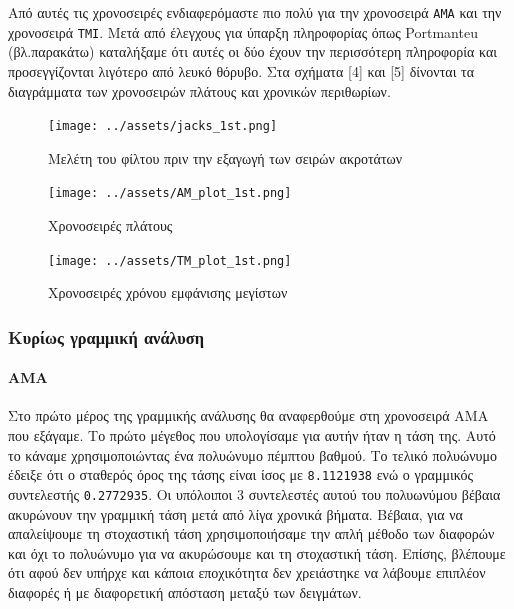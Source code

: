 \documentclass[11pt,]{article}
\let\oldparagraph\paragraph
\renewcommand{\paragraph}[1]{\oldparagraph{#1}\mbox{}}
\begin{document}
Από αυτές τις χρονοσειρές ενδιαφερόμαστε πιο πολύ για την χρονοσειρά
\texttt{AMA} και την χρονοσειρά \texttt{TMI}. Μετά από έλεγχους για
ύπαρξη πληροφορίας όπως Portmanteu (βλ.παρακάτω) καταλήξαμε ότι αυτές οι
δύο έχουν την περισσότερη πληροφορία και προσεγγίζονται λιγότερο από
λευκό θόρυβο. Στα σχήματα {[}4{]} και {[}5{]} δίνονται τα διαγράμματα
των χρονοσειρών πλάτους και χρονικών περιθωρίων.

\begin{figure}
\centering
\texttt{[image: ../assets/jacks\_1st.png]}
\caption{Μελέτη του φίλτου πριν την εξαγωγή των σειρών ακροτάτων}
\end{figure}

\begin{figure}
\centering
\texttt{[image: ../assets/AM\_plot\_1st.png]}
\caption{Χρονοσειρές πλάτους}
\end{figure}

\begin{figure}
\centering
\texttt{[image: ../assets/TM\_plot\_1st.png]}
\caption{Χρονοσειρές χρόνου εμφάνισης μεγίστων}
\end{figure}

\hypertarget{ux3baux3c5ux3c1ux3afux3c9ux3c2-ux3b3ux3c1ux3b1ux3bcux3bcux3b9ux3baux3ae-ux3b1ux3bdux3acux3bbux3c5ux3c3ux3b7}{%
\subsubsection{Κυρίως γραμμική
ανάλυση}\label{ux3baux3c5ux3c1ux3afux3c9ux3c2-ux3b3ux3c1ux3b1ux3bcux3bcux3b9ux3baux3ae-ux3b1ux3bdux3acux3bbux3c5ux3c3ux3b7}}

\hypertarget{ama}{%
\paragraph{AMA}\label{ama}}

Στο πρώτο μέρος της γραμμικής ανάλυσης θα αναφερθούμε στη χρονοσειρά AMA
που εξάγαμε. Το πρώτο μέγεθος που υπολογίσαμε για αυτήν ήταν η τάση της.
Αυτό το κάναμε χρησιμοποιώντας ένα πολυώνυμο πέμπτου βαθμού. Το τελικό
πολυώνυμο έδειξε ότι ο σταθερός όρος της τάσης είναι ίσος με
\texttt{8.1121938} ενώ ο γραμμικός συντελεστής \texttt{0.2772935}. Οι
υπόλοιποι 3 συντελεστές αυτού του πολυωνύμου βέβαια ακυρώνουν την
γραμμική τάση μετά από λίγα χρονικά βήματα. Βέβαια, για να απαλείψουμε
τη στοχαστική τάση χρησιμοποιήσαμε την απλή μέθοδο των διαφορών και όχι
το πολυώνυμο για να ακυρώσουμε και τη στοχαστική τάση. Επίσης, βλέπουμε
ότι αφού δεν υπήρχε και κάποια εποχικότητα δεν χρειάστηκε να λάβουμε
επιπλέον διαφορές ή με διαφορετική απόσταση μεταξύ των δειγμάτων.
\end{document}
